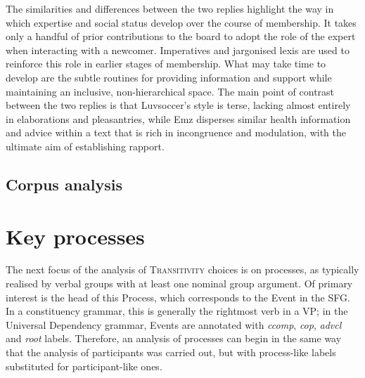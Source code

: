 \documentclass{article}
\begin{document}


The similarities and differences between the two replies highlight the way in which expertise and social status develop over the course of membership. It takes only a handful of prior contributions to the board to adopt the role of the expert when interacting with a newcomer. Imperatives and jargonised lexis are used to reinforce this role in earlier stages of membership. What may take time to develop are the subtle routines for providing information and support while maintaining an inclusive, non-hierarchical space. The main point of contrast between the two replies is that Luvsoccer's style is terse, lacking almost entirely in elaborations and pleasantries, while Emz disperses similar health information and advice within a text that is rich in incongruence and modulation, with the ultimate aim of establishing rapport. %

\subsection{Corpus analysis}


\section{Key processes} 

The next focus of the analysis of \textsc{Transitivity} choices is on processes, as typically realised by verbal groups with at least one nominal group argument. Of primary interest is the head of this Process, which corresponds to the Event in the SFG. In a constituency grammar, this is generally the rightmost verb in a VP; in the Universal Dependency grammar, Events are annotated with \emph{ccomp}, \emph{cop}, \emph{advcl} and \emph{root} labels. Therefore, an analysis of processes can begin in the same way that the analysis of participants was carried out, but with process-like labels substituted for participant-like ones.
\end{document}
